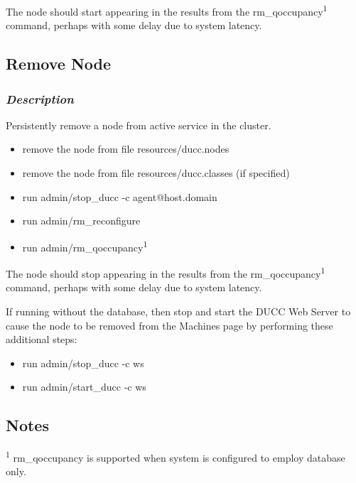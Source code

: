 	The node should start appearing in the results from the
	rm\_qoccupancy\textsuperscript{1} command, perhaps with 
	some delay due to system latency.
	
\subsection{Remove Node}
\label{subsec:admin.remove-node}

    \subsubsection{{\em Description}}
    Persistently remove a node from active service in the cluster.
    \begin{itemize}
      \item remove the node from file resources/ducc.nodes
      \item remove the node from file resources/ducc.classes (if specified)
      \item run admin/stop\_ducc -c agent@host.domain
      \item run admin/rm\_reconfigure
      \item run admin/rm\_qoccupancy\textsuperscript{1}
    \end{itemize}

	The node should stop appearing in the results from the
	rm\_qoccupancy\textsuperscript{1} command, perhaps with
	some delay due to system latency.
	
	If running without the database, then stop and start the DUCC
	Web Server 	to cause the node to be removed from the Machines
	page by performing these additional steps:
	
	 \begin{itemize}
      \item run admin/stop\_ducc -c ws
      \item run admin/start\_ducc -c ws
    \end{itemize}
	
\subsection{Notes}
\label{subsec:admin.notes}

	\textsuperscript{1} rm\_qoccupancy is supported when system is configured
	to employ database only.